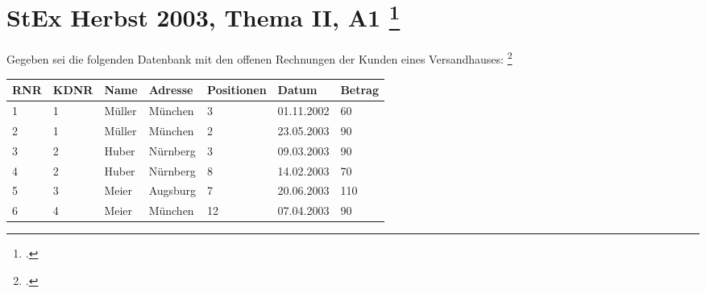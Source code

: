 \documentclass{lehramt-informatik-aufgabe}
\begin{document}

\section{StEx Herbst 2003, Thema II, A1
\footcite[Thema 2 Aufgabe 1]{66113:2003:09}
}

Gegeben sei die folgenden Datenbank mit den offenen Rechnungen der
Kunden eines Versandhauses:
\footcite[Seite 2 Aufgabe 4]{db:ab:5}

\begin{tabular}{|l|l|l|l|l|l|l|}
\textbf{RNR} & \textbf{KDNR} & \textbf{Name} & \textbf{Adresse} & \textbf{Positionen} & \textbf{Datum} & \textbf{Betrag}
\\\hline
1   & 1    & Müller & München  & 3          & 01.11.2002 & 60     \\
2   & 1    & Müller & München  & 2          & 23.05.2003 & 90     \\
3   & 2    & Huber  & Nürnberg & 3          & 09.03.2003 & 90     \\
4   & 2    & Huber  & Nürnberg & 8          & 14.02.2003 & 70     \\
5   & 3    & Meier  & Augsburg & 7          & 20.06.2003 & 110    \\
6   & 4    & Meier  & München  & 12         & 07.04.2003 & 90
\end{tabular}
\end{document}
